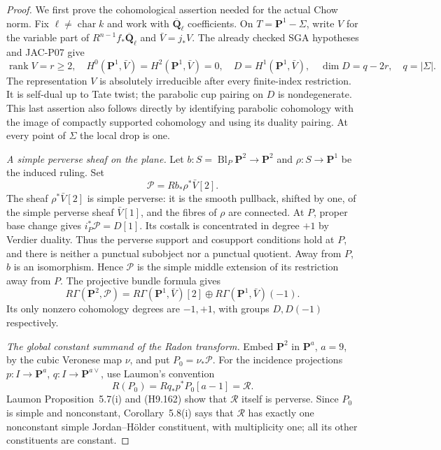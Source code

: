 \begin{proof}
We first prove the cohomological assertion needed for the
actual Chow norm. Fix $\ell\ne\operatorname{char}k$ and work
with $\overline{\mathbf Q}_\ell$ coefficients. On
$T=\mathbf P^1-\Sigma$, write $V$ for the variable part of
$R^{n-1}f_*\overline{\mathbf Q}_\ell$ and
$\bar V=j_*V$. The already checked SGA hypotheses and
JAC-P07 give
\[
 \operatorname{rank}V=r\ge2,\quad
 H^0(\mathbf P^1,\bar V)=H^2(\mathbf P^1,\bar V)=0,
 \quad D=H^1(\mathbf P^1,\bar V),\quad
 \dim D=q-2r,\quad q=|\Sigma|.
                                                               \tag{H9.160}
\]
The representation $V$ is absolutely irreducible after every
finite-index restriction. It is self-dual up to Tate twist;
the parabolic cup pairing on $D$ is nondegenerate. This last
assertion also follows directly by identifying parabolic
cohomology with the image of compactly supported cohomology
and using its duality pairing. At every point of $\Sigma$
the local drop is one.

\emph{A simple perverse sheaf on the plane.}
Let $b:S=\operatorname{Bl}_P\mathbf P^2\to\mathbf P^2$
and $\rho:S\to\mathbf P^1$ be the induced ruling. Set
\[
                  \mathcal P=Rb_*\rho^*\bar V[2].
                                                               \tag{H9.161}
\]
The sheaf $\rho^*\bar V[2]$ is simple perverse: it is the
smooth pullback, shifted by one, of the simple perverse sheaf
$\bar V[1]$, and the fibres of $\rho$ are connected. At $P$,
proper base change gives
$i_P^*\mathcal P=D[1]$. Its costalk is concentrated in degree
$+1$ by Verdier duality. Thus the perverse support and
cosupport conditions hold at $P$, and there is neither a
punctual subobject nor a punctual quotient. Away from $P$,
$b$ is an isomorphism. Hence $\mathcal P$ is the simple
middle extension of its restriction away from $P$.
The projective bundle formula gives
\[
 R\Gamma(\mathbf P^2,\mathcal P)
  =R\Gamma(\mathbf P^1,\bar V)[2]
       \oplus R\Gamma(\mathbf P^1,\bar V)(-1).
                                                               \tag{H9.162}
\]
Its only nonzero cohomology degrees are $-1,+1$, with groups
$D,D(-1)$ respectively.

\emph{The global constant summand of the Radon transform.}
Embed $\mathbf P^2$ in $\mathbf P^a$, $a=9$, by the cubic
Veronese map $\nu$, and put $P_0=\nu_*\mathcal P$.
For the incidence projections
$p:I\to\mathbf P^a$, $q:I\to\mathbf P^{a\vee}$, use
Laumon's convention
\[
                  R(P_0)=Rq_*p^*P_0[a-1]=\mathcal R.
                                                               \tag{H9.163}
\]
Laumon Proposition~5.7(i) and (H9.162) show that
$\mathcal R$ itself is perverse. Since $P_0$ is simple and
nonconstant, Corollary~5.8(i) says that $\mathcal R$ has
exactly one nonconstant simple Jordan--H\"older constituent,
with multiplicity one; all its other constituents are constant.


\end{proof}
